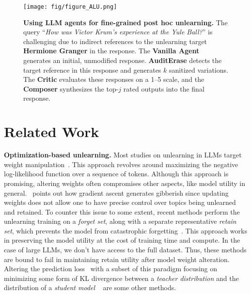 \begin{figure*}[t]
    \centering
    \texttt{[image: fig/figure\_ALU.png]}
    \caption{\textbf{Using LLM agents for fine-grained post hoc unlearning.} The query \enquote{\textit{How was Victor Krum's experience at the Yule Ball?}} is challenging due to indirect references to the unlearning target \textbf{Hermione Granger} in the response. The \textbf{Vanilla Agent} generates an initial, unmodified response. \textbf{AuditErase} detects the target reference in this response and generates $k$ sanitized variations. The \textbf{Critic} evaluates these responses on a 1–5 scale, and the \textbf{Composer} synthesizes the top-$j$ rated outputs into the final response.}
    \label{fig:alu_framework}
\end{figure*}
\section{Related Work}
\textbf{Optimization-based unlearning.} Most studies on unlearning in LLMs target weight manipulation~\cite{yao2024largelanguagemodelunlearning,liu2024revisitingwhosharrypotter,jang2022knowledge,jia2024soul}. This approach revolves around maximizing the negative log-likelihood function over a sequence of tokens. Although this approach is promising, altering weights often compromises other aspects, like model utility in general.~\cite{liu2024revisitingwhosharrypotter} points out how gradient ascent \cite{yao2024largelanguagemodelunlearning} generates gibberish since updating weights does not allow one to have precise control over topics being unlearned and retained. To counter this issue to some extent, recent methods perform the unlearning training on a \emph{forget set}, along with a separate representative \emph{retain set}, which prevents the model from catastrophic forgetting~\cite{liu2024revisitingwhosharrypotter,maini2024tofu,sinha2024unstarunlearningselftaughtantisample}. This approach works in preserving the model utility at the cost of training time and compute. In the case of large LLMs, we don't have access to the full dataset. Thus, these methods are bound to fail in maintaining retain utility after model weight alteration. Altering the prediction loss~\cite{zhang2024negativepreferenceoptimizationcatastrophic,liu2024revisitingwhosharrypotter} with a subset of this paradigm focusing on minimizing some form of KL divergence between a \emph{teacher distribution} and the distribution of a \emph{student model} ~\cite{liu2024revisitingwhosharrypotter} are some other methods.\par

